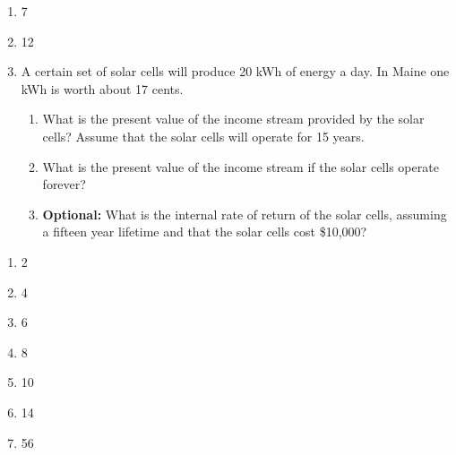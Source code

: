 \documentclass[12pt]{article}
\begin{document}

\begin{enumerate}
\setlength{\itemsep}{-1mm}
  \item 7
  \item 12
  \item A certain set of solar cells will produce 20 kWh of energy a
    day.  In Maine one kWh is worth about 17 cents.
\begin{enumerate}
  \item What is the present value of the income stream provided by the
    solar cells?  Assume that the solar cells will operate for 15
    years. 
  \item What is the present value of the income stream if the solar
    cells operate forever?
  \item {\bf Optional:}  What is the internal rate of return of the
    solar cells, assuming a fifteen year lifetime and that the solar
    cells cost \$10,000?
\end{enumerate}

\end{enumerate}




\begin{enumerate}
\setlength{\itemsep}{-1mm}
\item 2
\item 4
\item 6
\item 8
\item 10
\item 14
\item 56
\end{enumerate}
\end{document}

